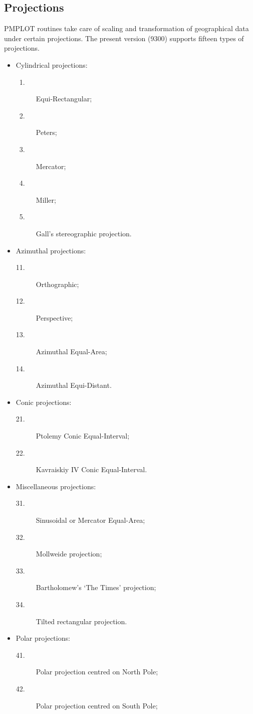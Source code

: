 \documentclass[titlepage,a4paper]{article}
\begin{document}
\subsection{Projections}
\label{projections}
PMPLOT routines take care of scaling and transformation of geographical
data under certain projections. The present version (9300) supports fifteen
types of projections.
\begin{itemize}
\item Cylindrical projections:
   \begin{description}
   \item[~1.] Equi-Rectangular;
   \item[~2.] Peters;
   \item[~3.] Mercator;
   \item[~4.] Miller;
   \item[~5.] Gall's stereographic projection.
   \end{description}
\item Azimuthal projections:
   \begin{description}
   \item[11.] Orthographic;
   \item[12.] Perspective;
   \item[13.] Azimuthal Equal-Area;
   \item[14.] Azimuthal Equi-Distant.
   \end{description}
\item Conic projections:
   \begin{description}
   \item[21.] Ptolemy Conic Equal-Interval;
   \item[22.] Kavraiskiy IV Conic Equal-Interval.
   \end{description}
\item Miscellaneous projections:
   \begin{description}
   \item[31.] Sinusoidal or Mercator Equal-Area;
   \item[32.] Mollweide projection;
   \item[33.] Bartholomew's `The Times' projection;
   \item[34.] Tilted rectangular projection.
   \end{description}
\item Polar projections:
   \begin{description}
   \item[41.] Polar projection centred on North Pole;
   \item[42.] Polar projection centred on South Pole;
   \end{description}
\end{itemize}
\end{document}
